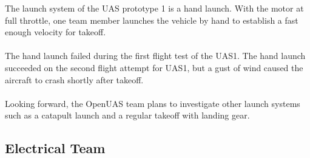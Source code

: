 \documentclass{article}
\begin{document}
The launch system of the UAS prototype 1 is a hand launch. With the motor at full throttle, one team member launches the vehicle by hand to establish a fast enough velocity for takeoff. \\\\
The  hand launch failed during the first flight test of the UAS1. The hand launch succeeded on the second flight attempt for UAS1, but a gust of wind caused the aircraft to crash shortly after takeoff. \\\\
Looking forward, the OpenUAS team plans to investigate other launch systems such as a catapult launch and a regular takeoff with landing gear.

\subsection{Electrical Team}
\end{document}
